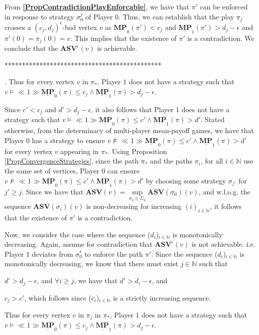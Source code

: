 From \textbf{\cref{PropContradictionPlayEnforcable}}, we have that $\pi'$ can be enforced in response to strategy $\sigma_0^j$ of Player 0. Thus, we can establish that the play $\pi_j$ crosses a $(c_j, d_j)^{\epsilon}$-bad vertex $v$ as $\underline{\mathbf{MP}}_0(\pi') < c_j$ and $ \underline{\mathbf{MP}}_1(\pi') > d_j-\epsilon$ and $\pi'(0) = \pi_j(0) = v$. This implies that the existence of $\pi'$ is a contradiction. We conclude that the $\mathbf{ASV}^{\epsilon}(v)$ is achievable.

*********************************************

.
Thus for every vertex $v$ in $\pi_*$, Player $1$ does not have a strategy such that $v \models \ll 1 \gg \underline{\mathbf{MP}}_0(\pi) \leqslant c_j \land \underline{\mathbf{MP}}_1(\pi) > d_j-\epsilon$.

Since $c' < c_j$ and $d' > d_j-\epsilon$, it also follows that Player $1$ does not have a strategy such that $v \models \ll 1 \gg \underline{\mathbf{MP}}_0(\pi) \leqslant c' \land \underline{\mathbf{MP}}_1(\pi) > d'$.
Stated otherwise, from the determinacy of multi-player mean-payoff games, we have that Player $0$ has a strategy to ensure $v \not \models \ll 1 \gg \underline{\mathbf{MP}}_0(\pi) \leqslant c' \land \underline{\mathbf{MP}}_1(\pi) > d'$ for every vertex $v$ appearing in $\pi_*$.
Using Proposition \ref{PropConvergenceStrategies}, since the path $\pi_*$ and the paths $\pi_i$, for all $i \in \mathbb{N}$ use the same set of vertices, Player $0$ can ensure $v \not \models \ll 1 \gg \underline{\mathbf{MP}}_0(\pi) \leqslant c' \land \underline{\mathbf{MP}}_1(\pi) > d'$ by choosing some strategy $\sigma_{j'}$ for $j' \ge j$.
Since we have that $\mathbf{ASV}(v) = \sup\limits_{\sigma_0 \in \Sigma_0} \mathbf{ASV}(\sigma_0)(v)$, and w.l.o.g. the sequence $\mathbf{ASV}(\sigma_i)(v)$ is non-decreasing for increasing $(i)_{i \in \mathbb{N}}$, it follows that the existence of $\pi'$ is a contradiction.

Now, we consider the case where the sequence ($d_i$)$_{i \in \mathbb{N}}$ is monotonically decreasing.
Again, assume for contradiction that $\mathbf{ASV}^{\epsilon}(v)$ is not achievable.  i.e. Player 1 deviates from $\sigma_0^*$ to enforce the path $\pi'$.
Since the sequence ($d_i$)$_{i \in \mathbb{N}}$ is monotonically decreasing, we know that there must exist $j \in \mathbb{N}$ such that 
\begin{inparaenum}[(i)]
\item $d' > d_j - \epsilon$, and $\forall i \geqslant j$, we have that $d' > d_i - \epsilon$, and
\item $c_j > c'$, which follows since ($c_i$)$_{i \in \mathbb{N}}$ is a strictly increasing sequence.
\end{inparaenum}
Thus for every vertex $v$ in $\pi_j$ in $\pi_*$, Player $1$ does not have a strategy such that $v \models \ll 1 \gg \underline{\mathbf{MP}}_0(\pi) \leqslant c_j \land \underline{\mathbf{MP}}_1(\pi) > d_j-\epsilon$.

